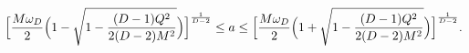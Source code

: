 \begin{equation}
\Big[{M 
\omega_D\over 2} \Big(1 - {\sqrt {1 - {(D-1)Q^2 \over{2 (D-2) 
M^2}}}}\Big) \Big]^{1\over{D-2}} \le a \le
\Big[{M \omega_D\over 2} \Big(1 + {\sqrt {1 - {(D-1)Q^2 \over{2 (D-2)
M^2}}}}\Big) \Big]^{1\over{D-2}}.
\end{equation}

